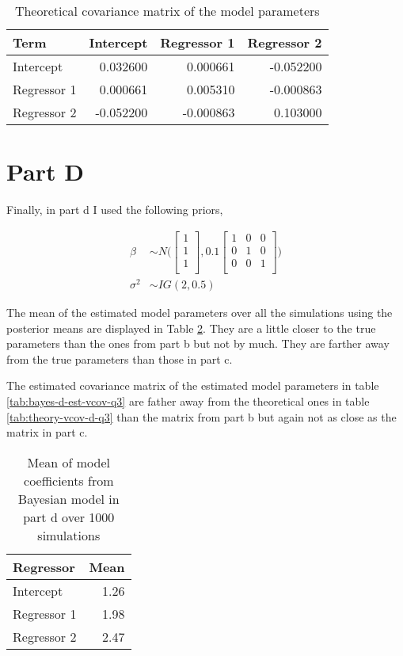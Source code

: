 \documentclass[]{book}
\begin{document}
\begin{table}

\caption{\label{tab:theory-vcov-c-q3}Theoretical covariance matrix of the model parameters}
\centering
\begin{tabular}[t]{lrrr}
\toprule
Term & Intercept & Regressor 1 & Regressor 2\\
\midrule
Intercept & 0.032600 & 0.000661 & -0.052200\\
Regressor 1 & 0.000661 & 0.005310 & -0.000863\\
Regressor 2 & -0.052200 & -0.000863 & 0.103000\\
\bottomrule
\end{tabular}
\end{table}

\hypertarget{part-d-2}{%
\section{Part D}\label{part-d-2}}

Finally, in part d I used the following priors,

\begin{align}
  \beta &\sim N \bigg( 
  \begin{bmatrix}
  1\\
  1\\
  1\\
  \end{bmatrix},
  0.1 \begin{bmatrix}
  1 & 0 & 0\\
  0 & 1 & 0\\
  0 & 0 & 1\\
  \end{bmatrix} \bigg)\\
  \sigma^2 &\sim IG(2, 0.5)
\end{align}

The mean of the estimated model parameters over all the simulations using the posterior means are displayed in Table \ref{tab:bayes-d-mean-coefs-q3}. They are a little closer to the true parameters than the ones from part b but not by much. They are farther away from the true parameters than those in part c.

The estimated covariance matrix of the estimated model parameters in table \ref{tab:bayes-d-est-vcov-q3} are father away from the theoretical ones in table \ref{tab:theory-vcov-d-q3} than the matrix from part b but again not as close as the matrix in part c.

\begin{table}

\caption{\label{tab:bayes-d-mean-coefs-q3}Mean of model coefficients from Bayesian model in part d over 1000 simulations}
\centering
\begin{tabular}[t]{lr}
\toprule
Regressor & Mean\\
\midrule
Intercept & 1.26\\
Regressor 1 & 1.98\\
Regressor 2 & 2.47\\
\bottomrule
\end{tabular}
\end{table}
\end{document}
